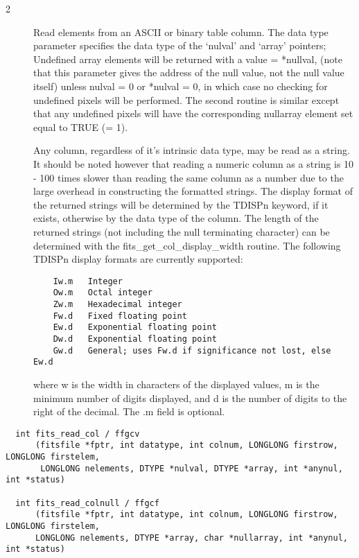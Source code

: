 \documentclass[11pt]{book}
\begin{document}
\begin{description}
\item[2 ] Read elements from an ASCII or binary table column.  The data type
    parameter specifies the data type of the `nulval' and `array'  pointers;
    Undefined array elements will be returned with a value = *nullval,
    (note that this parameter gives the address of the null value, not the
    null value itself) unless nulval = 0 or *nulval = 0, in which case
    no checking for undefined pixels will be performed.  The second
    routine is similar except that any undefined pixels will have the
    corresponding nullarray element set equal to TRUE (= 1).

    Any column, regardless of it's intrinsic data type, may be read as a
    string.  It should be noted however that reading a numeric column
    as a string is 10 - 100 times slower than reading the same column
    as a number due to the large overhead in constructing the formatted
    strings.  The display format of the returned strings will be
    determined by the TDISPn keyword, if it exists, otherwise by the
    data type of the column.  The length of the returned strings (not
    including the null terminating character) can be determined with
    the fits\_get\_col\_display\_width routine.  The following TDISPn
    display formats are currently supported:

\begin{verbatim}
    Iw.m   Integer
    Ow.m   Octal integer
    Zw.m   Hexadecimal integer
    Fw.d   Fixed floating point
    Ew.d   Exponential floating point
    Dw.d   Exponential floating point
    Gw.d   General; uses Fw.d if significance not lost, else Ew.d
\end{verbatim}
    where w is the width in characters of the displayed values, m is the minimum
    number of digits displayed, and d is the number of digits to the right of the
    decimal.  The .m field is optional.
   \label{ffgcv} \label{ffgcf}
\end{description}

\begin{verbatim}
  int fits_read_col / ffgcv
      (fitsfile *fptr, int datatype, int colnum, LONGLONG firstrow, LONGLONG firstelem,
       LONGLONG nelements, DTYPE *nulval, DTYPE *array, int *anynul, int *status)

  int fits_read_colnull / ffgcf
      (fitsfile *fptr, int datatype, int colnum, LONGLONG firstrow, LONGLONG firstelem,
      LONGLONG nelements, DTYPE *array, char *nullarray, int *anynul, int *status)
\end{verbatim}
\end{document}
